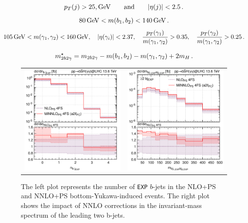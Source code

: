 \documentclass[11pt,a4paper]{article}
\begin{document}
\begin{equation}
\label{eq:ptjcuts}
p_T(j) > 25,\mathrm{GeV} \qquad {\rm and} \qquad |\eta(j)| < 2.5\,.
\end{equation}
\begin{equation}
    \label{eq:mbjcut}
    80\, \mathrm{GeV} < m(b_1,b_2)< 140\,\mathrm{GeV}\,.
\end{equation}
\begin{equation}
\label{eq:photoncuts}
    105\,\mathrm{GeV} < m(\gamma_1, \gamma_2) < 160\,\mathrm{GeV}, \quad |\eta(\gamma_i)|< 2.37, \quad
    \frac{p_T(\gamma_1)}{m(\gamma_1, \gamma_2)} > 0.35, \quad \frac{p_T(\gamma_2)}{m(\gamma_1, \gamma_2)} > 0.25\,.
\end{equation}

\begin{equation}
\label{eq:mbbggs}
    m_{2b2\gamma}^{\star} = m_{2b2\gamma} - m(b_1,b_2) - m(\gamma_1,\gamma_2) + 2m_H \,.
\end{equation}

\begin{figure}[t!]
\begin{center}
\begin{tabular}{cc}
\includegraphics[width=.45\textwidth, page=1]{plots/4fs/n_b_jets-EXP.pdf}&
\includegraphics[width=.45\textwidth, page=1]{plots/4fs/m_bb-EXP-2bjet.pdf}
\end{tabular}
\vspace*{1ex}
\caption{The left plot represents the number of \texttt{EXP} $b$-jets in the NLO+PS and NNLO+PS bottom-Yukawa-induced events. The right plot shows the impact of NNLO corrections in the invariant-mass spectrum of the leading two b-jets.\label{fig:4fsMBB}}
\end{center}
\end{figure}
\end{document}
